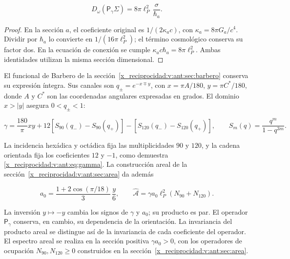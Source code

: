 \begin{equation}
D_\omega(\mathsf P_\gamma\Sigma)
=8\pi\ell_P^2\,\frac{\sigma}{\hbar_a}.
\label{x_reciprocidad:nuc12:eq:4.3}
\end{equation}



\begin{proof}
En la sección \(a\), el coeficiente original es \(1/(2\kappa_a c)\), con \(\kappa_a=8\pi G_a/c^4\). Dividir por \(\hbar_a\) lo convierte en \(1/(16\pi\ell_P^2)\); el término cosmológico conserva su factor dos. En la ecuación de conexión se cumple \(\kappa_a c\hbar_a=8\pi\ell_P^2\). Ambas identidades utilizan la misma sección dimensional.
\end{proof}

El funcional de Barbero de la sección~\ref{x_reciprocidad:v:ant:sec:barbero} conserva su expresión íntegra. Sus canales son \(q_\pm=e^{-x\mp y}\), con \(x=\pi A/180\), \(y=\pi C^*/180\), donde \(A\) y \(C^*\) son las coordenadas angulares expresadas en grados. El dominio \(x>|y|\) asegura \(0<q_\pm<1\):



\begin{equation}
\gamma=\frac{180}{\pi}xy+
12[S_{90}(q_-)-S_{90}(q_+)]
-[S_{120}(q_-)-S_{120}(q_+)],\qquad
S_m(q)=\frac{q^m}{1-q^{3m}}.
\label{x_reciprocidad:nuc12:eq:4.4}
\end{equation}



La incidencia hexádica y octádica fija las multiplicidades \(90\) y \(120\), y la cadena orientada fija los coeficientes \(12\) y \(-1\), como demuestra \eqref{x_reciprocidad:v:ant:eq:gamma}. La construcción areal de la sección~\ref{x_reciprocidad:v:ant:sec:area} da además



\begin{equation}
a_0=\frac{1+2\cos(\pi/18)}3\,\frac y6,\qquad
\widehat{\mathcal A}=\gamma a_0\ell_P^2(N_{90}+N_{120}).
\label{x_reciprocidad:nuc12:eq:4.5}
\end{equation}



La inversión \(y\mapsto-y\) cambia los signos de \(\gamma\) y \(a_0\); su producto es par. El operador \(\mathsf P_\gamma\) conserva, en cambio, su dependencia de la orientación. La invariancia del producto areal se distingue así de la invariancia de cada coeficiente del operador. El espectro areal se realiza en la sección positiva \(\gamma a_0>0\), con los operadores de ocupación \(N_{90},N_{120}\geq0\) construidos en la sección~\ref{x_reciprocidad:v:ant:sec:area}.

